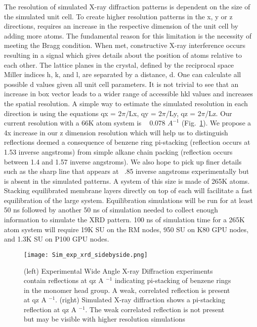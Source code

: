 The resolution of simulated X-ray diffraction patterns is dependent on the
size of the simulated unit cell. To create higher resolution patterns in 
the x, y or z directions, requires an increase in the respective dimension
of the unit cell by adding more atoms. The fundamental reason for this
limitation is the necessity of meeting the Bragg condition. When met,
constructive X-ray interference occurs resulting in a signal which gives
details about the position of atoms relative to each other. The lattice
planes in the crystal, defined by the reciprocal space Miller indices 
h, k, and l, are separated by a distance, d. One can calculate all possible
d values given all unit cell parameters. It is not trivial to see that an
increase in box vector leads to a wider range of accessible hkl values 
and increases the spatial resolution. A simple way to estimate the simulated
resolution in each direction is using the equations qx = 2$\pi$/Lx, qy =
2$\pi$/Ly, qz = 2$\pi$/Lz. Our current resolution with a 66K atom system is ~ 0.078 $A^{-1}$ (Fig.~\ref{fig:expxrdcomp}). 
We propose a 4x increase in our z dimension resolution which will
help us to distinguish reflections deemed a consequence of benzene ring 
pi-stacking (reflection occurs at 1.53 inverse angstroms) from simple
alkane chain packing (reflection occurs between 1.4 and 1.57 inverse
angstroms). We also hope to pick up finer details such as the sharp line
that appears at ~.85 inverse angstroms experimentally but is absent in 
the simulated patterns. A system of this size is made of 265K atoms. 
Stacking equilibrated membrane layers directly on top of each will 
facilitate a fast equilibration of the large system. Equilibration 
simulations will be run for at least 50 ns followed by another 50 ns of 
simulation needed to collect enough information to simulate the XRD 
pattern. 100 ns of simulation time for a 265K atom system will require 
19K SU on the RM nodes, 950 SU on K80 GPU nodes, and 1.3K SU on P100 GPU nodes.     
\begin{figure}
\centering
\texttt{[image: Sim\_exp\_xrd\_sidebyside.png]}
	\caption{(left) Experimental Wide Angle X-ray Diffraction experiments contain
reflections at qz  A $^{-1}$ indicating pi-stacking of benzene
rings in the monomer head group. A weak, correlated reflection is present at 
qz  A $^{-1}$. (right) Simulated X-ray diffraction shows a pi-stacking reflection
at qz  A $^{-1}$. The weak correlated reflection is not
present but may be visible with higher resolution simulations}
	\label{fig:expxrdcomp}

\end{figure}

